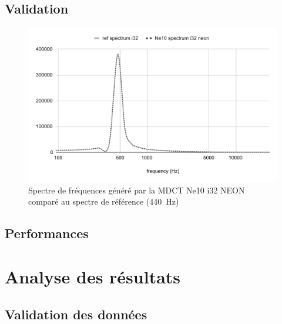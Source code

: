 \documentclass{article}
\begin{document}
    \subsection{Validation}
    \begin{figure}[H]
        \centering
        \includegraphics[width=.8\linewidth]{./images/validation_ne10_i32_neon.pdf}
        \caption{Spectre de fréquences généré par la MDCT Ne10 i32 NEON comparé au spectre de référence (\SI{440}{\hertz})}
        \label{fig:validation_ne10_i32_neon}
    \end{figure}


    \subsection{Performances}


    \newpage
    \section{Analyse des résultats}
    \subsection{Validation des données}
    \label{sec:validation}



\end{document}
